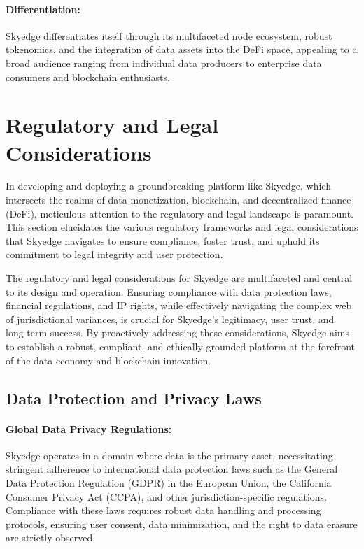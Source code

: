 \documentclass{article}
\begin{document}
\paragraph{Differentiation:} Skyedge differentiates itself through its multifaceted node ecosystem, robust tokenomics, and the integration of data assets into the DeFi space, appealing to a broad audience ranging from individual data producers to enterprise data consumers and blockchain enthusiasts.


\pagebreak

\section{Regulatory and Legal Considerations}
In developing and deploying a groundbreaking platform like Skyedge, which intersects the realms of data monetization, blockchain, and decentralized finance (DeFi), meticulous attention to the regulatory and legal landscape is paramount. This section elucidates the various regulatory frameworks and legal considerations that Skyedge navigates to ensure compliance, foster trust, and uphold its commitment to legal integrity and user protection.

The regulatory and legal considerations for Skyedge are multifaceted and central to its design and operation. Ensuring compliance with data protection laws, financial regulations, and IP rights, while effectively navigating the complex web of jurisdictional variances, is crucial for Skyedge's legitimacy, user trust, and long-term success. By proactively addressing these considerations, Skyedge aims to establish a robust, compliant, and ethically-grounded platform at the forefront of the data economy and blockchain innovation.

\subsection{Data Protection and Privacy Laws}

\paragraph{Global Data Privacy Regulations:} Skyedge operates in a domain where data is the primary asset, necessitating stringent adherence to international data protection laws such as the General Data Protection Regulation (GDPR) in the European Union, the California Consumer Privacy Act (CCPA), and other jurisdiction-specific regulations. Compliance with these laws requires robust data handling and processing protocols, ensuring user consent, data minimization, and the right to data erasure are strictly observed.
\end{document}
